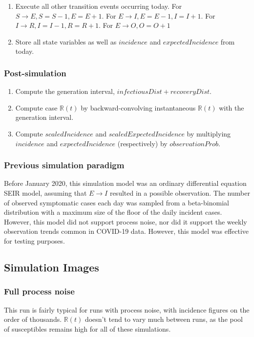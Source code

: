 \documentclass{article}
\newcommand{\nR}{\mathbb{R}}
\begin{document}
\begin{enumerate}
\begin{enumerate}
        \end{enumerate}
    
    \item Execute all other transition events occurring today. For $S \rightarrow E, S=S-1, E=E+1$. For $E \rightarrow I, E=E-1, I=I+1$. For $I \rightarrow R, I = I-1, R = R+1$. For $E \rightarrow O, O = O+1$
    

    
    \item Store all state variables as well as $incidence$ and $expectedIncidence$ from today.
\end{enumerate}

\subsubsection{Post-simulation}
\begin{enumerate}
    \item Compute the generation interval, $infectiousDist + recoveryDist.$ 
    \item Compute case $\nR(t)$ by backward-convolving instantaneous $\nR(t)$ with the generation interval.
    \item Compute $scaledIncidence$ and $scaledExpectedIncidence$ by multiplying $incidence$ and $expectedIncidence$ (respectively) by $observationProb$.
\end{enumerate}


\subsubsection{Previous simulation paradigm}
Before January 2020, this simulation model was an ordinary differential equation SEIR model, assuming that $E \rightarrow I$  resulted in a possible observation. The number of observed symptomatic cases each day was sampled from a beta-binomial distribution with a maximum size of the floor of the daily incident cases. However, this model did not support process noise, nor did it support the weekly observation trends common in COVID-19 data. However, this model was effective for testing purposes.

\clearpage
\subsection{Simulation Images}
\subsubsection{Full process noise}
This run is fairly typical for runs with process noise, with incidence figures on the order of thousands. $\nR(t)$ doesn't tend to vary much between runs, as the pool of susceptibles remains high for all of these simulations.
\end{document}
